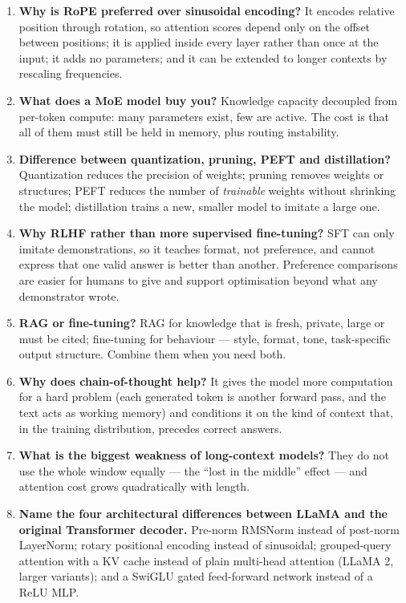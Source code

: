\documentclass[11pt,a4paper]{article}
\begin{document}
\begin{enumerate}
\item \textbf{Why is RoPE preferred over sinusoidal encoding?} It encodes relative position
  through rotation, so attention scores depend only on the offset between positions; it is
  applied inside every layer rather than once at the input; it adds no parameters; and it can
  be extended to longer contexts by rescaling frequencies.

\item \textbf{What does a MoE model buy you?} Knowledge capacity decoupled from per-token
  compute: many parameters exist, few are active. The cost is that all of them must still be
  held in memory, plus routing instability.

\item \textbf{Difference between quantization, pruning, PEFT and distillation?} Quantization
  reduces the precision of weights; pruning removes weights or structures; PEFT reduces the
  number of \emph{trainable} weights without shrinking the model; distillation trains a new,
  smaller model to imitate a large one.

\item \textbf{Why RLHF rather than more supervised fine-tuning?} SFT can only imitate
  demonstrations, so it teaches format, not preference, and cannot express that one valid answer
  is better than another. Preference comparisons are easier for humans to give and support
  optimisation beyond what any demonstrator wrote.

\item \textbf{RAG or fine-tuning?} RAG for knowledge that is fresh, private, large or must be
  cited; fine-tuning for behaviour --- style, format, tone, task-specific output structure.
  Combine them when you need both.

\item \textbf{Why does chain-of-thought help?} It gives the model more computation for a hard
  problem (each generated token is another forward pass, and the text acts as working memory)
  and conditions it on the kind of context that, in the training distribution, precedes correct
  answers.

\item \textbf{What is the biggest weakness of long-context models?} They do not use the whole
  window equally --- the ``lost in the middle'' effect --- and attention cost grows
  quadratically with length.

\item \textbf{Name the four architectural differences between LLaMA and the original
  Transformer decoder.} Pre-norm RMSNorm instead of post-norm LayerNorm; rotary positional
  encoding instead of sinusoidal; grouped-query attention with a KV cache instead of plain
  multi-head attention (LLaMA 2, larger variants); and a SwiGLU gated feed-forward network
  instead of a ReLU MLP.
\end{enumerate}
\end{document}
